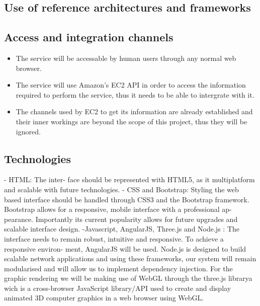 \documentclass[a4paper,12pt]{report}
\begin{document}
	
		
	\subsection{Use of reference architectures and frameworks}
	\subsection{Access and integration channels}
		\begin{itemize}
			\item The service will be accessable by human users through any normal web browser.
			\item The service will use Amazon's EC2 API in order to access the information required to perform the service, thus it needs to be able to intergrate with it.
			\item The channels used by EC2 to get its information are already established and their inner workings are beyond the scope of this project, thus they will be ignored.
		\end{itemize}
	\subsection{Technologies}
- HTML: The inter-
face should be represented with HTML5, as it multiplatform and
scalable with future technologies.
- CSS and Bootstrap: Styling the web based interface should be
handled through CSS3 and the Bootstrap framework. Bootstrap
allows for a responsive, mobile interface with a professional ap-
pearance. Importantly its current popularity allows for future
upgrades and scalable interface design.
-Javascript, AngularJS, Three.js and Node.js : The interface needs to remain
robust, intuitive and responsive. To achieve a responsive environ-
ment, AngularJS will be used. Node.js is designed to build scalable
network applications and using these frameworks, our system will
remain modularised and will allow us to implement dependency
injection. For the graphic rendering we will be making use of WebGL through the three.js librarya wich is a cross-browser JavaScript library/API used to create and display animated 3D computer graphics in a web browser using WebGL. 
\end{document}
